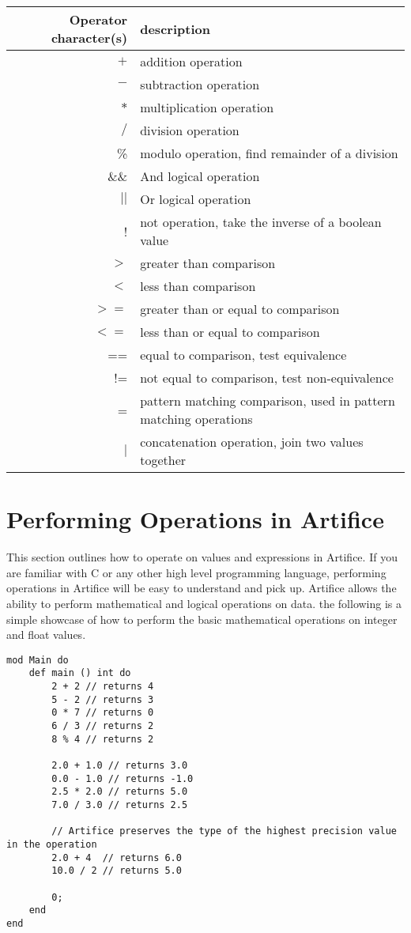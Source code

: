 \documentclass{article}
\begin{document}
\begin{center}
\begin{tabular}{|r|l|}
\hline
Operator character(s) & description \\
\hline
\hline
$+$ & addition operation \\
$-$ & subtraction operation \\
$*$ & multiplication operation \\
$/$ & division operation \\
\% & modulo operation, find remainder of a division \\
\hline
\hline
\&\& & And logical operation \\
$||$ & Or logical operation \\
! & not operation, take the inverse of a boolean value \\
\hline
$>$ & greater than comparison \\
$<$ & less than comparison \\
$>=$ & greater than or equal to comparison \\
$<=$ & less than or equal to comparison \\
== & equal to comparison, test equivalence \\
!= & not equal to comparison, test non-equivalence \\
~= & pattern matching comparison, used in pattern matching operations \\
\hline
\hline
$|$ & concatenation operation, join two values together \\
\hline
\end{tabular}
\end{center}


\section{Performing Operations in Artifice}

This section outlines how to operate on values and expressions in Artifice. If you are familiar with C or any other high level programming language, performing 
operations in Artifice will be easy to understand and pick up. Artifice allows the ability to perform mathematical and logical operations on data. the following is a
simple showcase of how to perform the basic mathematical operations on integer and float values.

\begin{lstlisting}
mod Main do
	def main () int do
		2 + 2 // returns 4
		5 - 2 // returns 3
		0 * 7 // returns 0
		6 / 3 // returns 2
		8 % 4 // returns 2

		2.0 + 1.0 // returns 3.0
		0.0 - 1.0 // returns -1.0
		2.5 * 2.0 // returns 5.0
		7.0 / 3.0 // returns 2.5

		// Artifice preserves the type of the highest precision value in the operation
		2.0 + 4  // returns 6.0
		10.0 / 2 // returns 5.0

		0;
	end
end
\end{lstlisting}
\end{document}
